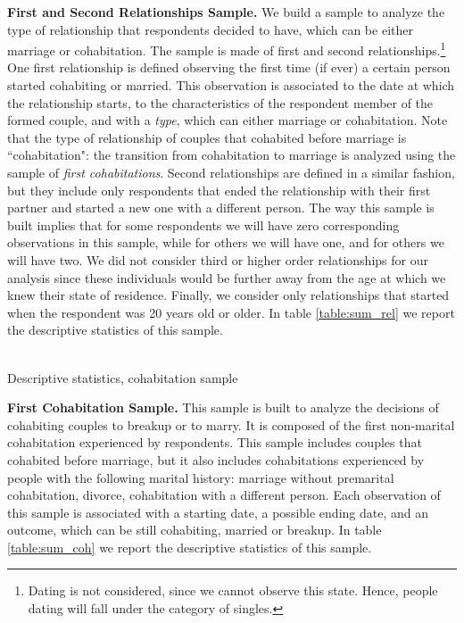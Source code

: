 \documentclass[12pt]{article}
\numberwithin{table}{section}
\begin{document}
\textbf{First and Second Relationships Sample.} We build a sample to analyze the type of relationship that respondents decided to have, which can be either marriage or cohabitation. The sample is made of first and second relationships.\footnote{Dating is not considered, since we cannot observe this state. Hence, people dating will fall under the category of singles.} One first relationship is defined observing the first time (if ever) a certain person started cohabiting or married. This observation is associated to the date at which the relationship starts, to the characteristics of the respondent member of the formed couple, and with a \textit{type}, which can either marriage or cohabitation. Note that the type of relationship of couples that cohabited before marriage is ``cohabitation": the transition from cohabitation to marriage is analyzed using the sample of \textit{first cohabitations}. Second relationships are defined in a similar fashion, but they include only respondents that ended the relationship with their first partner and started a new one with a different person. The way this sample is built implies that for some respondents we will have zero corresponding observations in this sample, while for others we will have one, and for others we will have two. We did not consider third or higher order relationships for our analysis since these individuals would be further away from the age at which we knew their state of residence. Finally, we consider only relationships that started when the respondent was 20 years old or older. In table \ref{table:sum_rel} we report the descriptive statistics of this sample.

\begin{table}[!htbp]\centering
	\caption{\\Descriptive statistics, cohabitation sample}
	\label{table:sum_rel}

\end{table}
\FloatBarrier
\textbf{First Cohabitation Sample.} This sample is built to analyze the decisions of cohabiting couples to breakup or to marry. It is composed of the first non-marital cohabitation experienced by respondents. This sample includes couples that cohabited before marriage, but it also includes cohabitations experienced by people with the following marital history: marriage without premarital cohabitation, divorce, cohabitation with a different person. Each observation of this sample is associated with a starting date, a possible ending date, and an outcome, which can be still cohabiting, married or breakup. In table \ref{table:sum_coh} we report the descriptive statistics of this sample.
\end{document}
